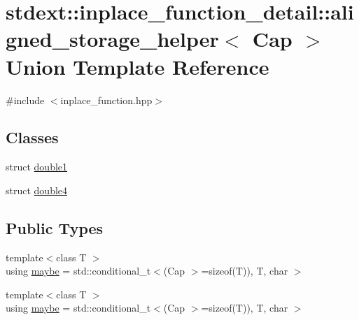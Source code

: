 \hypertarget{unionstdext_1_1inplace__function__detail_1_1aligned__storage__helper}{}\section{stdext\+:\+:inplace\+\_\+function\+\_\+detail\+:\+:aligned\+\_\+storage\+\_\+helper$<$ Cap $>$ Union Template Reference}
\label{unionstdext_1_1inplace__function__detail_1_1aligned__storage__helper}


{\ttfamily \#include $<$inplace\+\_\+function.\+hpp$>$}

\subsection*{Classes}
\begin{DoxyCompactItemize}
\item 
struct \hyperlink{structstdext_1_1inplace__function__detail_1_1aligned__storage__helper_1_1double1}{double1}
\item 
struct \hyperlink{structstdext_1_1inplace__function__detail_1_1aligned__storage__helper_1_1double4}{double4}
\end{DoxyCompactItemize}
\subsection*{Public Types}
\begin{DoxyCompactItemize}
\item 
{\footnotesize template$<$class T $>$ }\\using \hyperlink{unionstdext_1_1inplace__function__detail_1_1aligned__storage__helper_a8265d2d65d57b5e7de088f8b6fc02370}{maybe} = std\+::conditional\+\_\+t$<$(Cap $>$=sizeof(T)), T, char $>$
\item 
{\footnotesize template$<$class T $>$ }\\using \hyperlink{unionstdext_1_1inplace__function__detail_1_1aligned__storage__helper_a8265d2d65d57b5e7de088f8b6fc02370}{maybe} = std\+::conditional\+\_\+t$<$(Cap $>$=sizeof(T)), T, char $>$
\end{DoxyCompactItemize}
